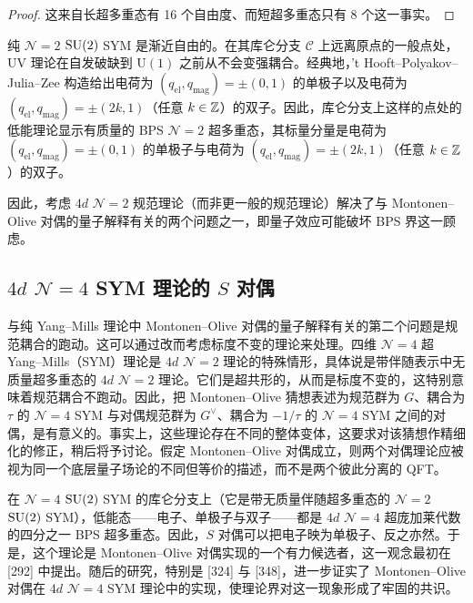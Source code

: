 \begin{proof}
这来自长超多重态有 16 个自由度、而短超多重态只有 8 个这一事实。
\end{proof}

\begin{example}[19.29]
纯 $\mathcal{N}=2$ $\operatorname{SU}(2)$ SYM 是渐近自由的。在其库仑分支 $\mathcal{C}$ 上远离原点的一般点处，UV 理论在自发破缺到 $\mathrm{U}(1)$ 之前从不会变强耦合。经典地，'t Hooft--Polyakov--Julia--Zee 构造给出电荷为 $(q_{\mathrm{el}},q_{\mathrm{mag}})=\pm(0,1)$ 的单极子以及电荷为 $(q_{\mathrm{el}},q_{\mathrm{mag}})=\pm(2k,1)$（任意 $k\in\mathbb{Z}$）的双子。因此，库仑分支上这样的点处的低能理论显示有质量的 BPS $\mathcal{N}=2$ 超多重态，其标量分量是电荷为 $(q_{\mathrm{el}},q_{\mathrm{mag}})=\pm(0,1)$ 的单极子与电荷为 $(q_{\mathrm{el}},q_{\mathrm{mag}})=\pm(2k,1)$（任意 $k\in\mathbb{Z}$）的双子。
\end{example}

因此，考虑 $4d$ $\mathcal{N}=2$ 规范理论（而非更一般的规范理论）解决了与 Montonen--Olive 对偶的量子解释有关的两个问题之一，即量子效应可能破坏 BPS 界这一顾虑。


\subsection{$4d$ $\mathcal{N}=4$ SYM 理论的 $S$ 对偶}

与纯 Yang--Mills 理论中 Montonen--Olive 对偶的量子解释有关的第二个问题是规范耦合的跑动。这可以通过改而考虑标度不变的理论来处理。四维 $\mathcal{N}=4$ 超 Yang--Mills（SYM）理论是 $4d$ $\mathcal{N}=2$ 理论的特殊情形，具体说是带伴随表示中无质量超多重态的 $4d$ $\mathcal{N}=2$ 理论。它们是超共形的，从而是标度不变的，这特别意味着规范耦合不跑动。因此，把 Montonen--Olive 猜想表述为规范群为 $G$、耦合为 $\tau$ 的 $\mathcal{N}=4$ SYM 与对偶规范群为 $G^\vee$、耦合为 $-1/\tau$ 的 $\mathcal{N}=4$ SYM 之间的对偶，是有意义的。事实上，这些理论存在不同的整体变体，这要求对该猜想作精细化的修正，稍后将予讨论。假定 Montonen--Olive 对偶成立，则两个对偶理论应被视为同一个底层量子场论的不同但等价的描述，而不是两个彼此分离的 QFT。

在 $\mathcal{N}=4$ $\operatorname{SU}(2)$ SYM 的库仑分支上（它是带无质量伴随超多重态的 $\mathcal{N}=2$ $\operatorname{SU}(2)$ SYM），低能态——电子、单极子与双子——都是 $4d$ $\mathcal{N}=4$ 超庞加莱代数的四分之一 BPS 超多重态。因此，$S$ 对偶可以把电子映为单极子、反之亦然。于是，这个理论是 Montonen--Olive 对偶实现的一个有力候选者，这一观念最初在 [292] 中提出。随后的研究，特别是 [324] 与 [348]，进一步证实了 Montonen--Olive 对偶在 $4d$ $\mathcal{N}=4$ SYM 理论中的实现，使理论界对这一现象形成了牢固的共识。

